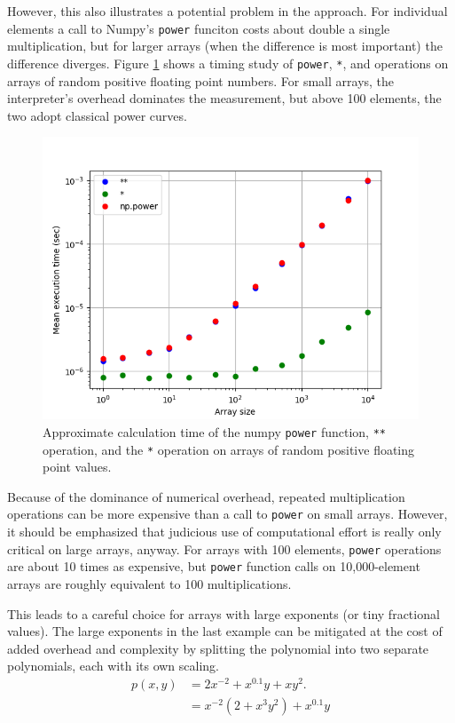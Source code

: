 However, this also illustrates a potential problem in the approach.  For individual elements a call to Numpy's \texttt{power} funciton costs about double a single multiplication, but for larger arrays (when the difference is most important) the difference diverges.  Figure \ref{fig:benchmark} shows a timing study of \texttt{power}, \texttt{*}, and \text{**} operations on arrays of random positive floating point numbers.  For small arrays, the interpreter's overhead dominates the measurement, but above 100 elements, the two adopt classical power curves.
\begin{figure}
\centering
\includegraphics[width=0.97\linewidth]{figures/benchmark.png}
\caption{Approximate calculation time of the numpy \texttt{power} function, \texttt{**} operation, and the \texttt{*} operation on arrays of random positive floating point values.}\label{fig:benchmark}
\end{figure}

Because of the dominance of numerical overhead, repeated multiplication operations can be more expensive than a call to \texttt{power} on small arrays.  However, it should be emphasized that judicious use of computational effort is really only critical on large arrays, anyway.  For arrays with 100 elements, \texttt{power} operations are about 10 times as expensive, but \texttt{power} function calls on 10,000-element arrays are roughly equivalent to 100 multiplications.

This leads to a careful choice for arrays with large exponents (or tiny fractional values).  The large exponents in the last example can be mitigated at the cost of added overhead and complexity by splitting the polynomial into two separate polynomials, each with its own scaling.
\begin{align}
p(x,y) &= 2x^{-2} + x^{0.1}y + xy^2.\nonumber\\
 &= x^{-2} \left(2 + x^3y^2 \right) + x^{0.1} y\nonumber\\
\end{align}

